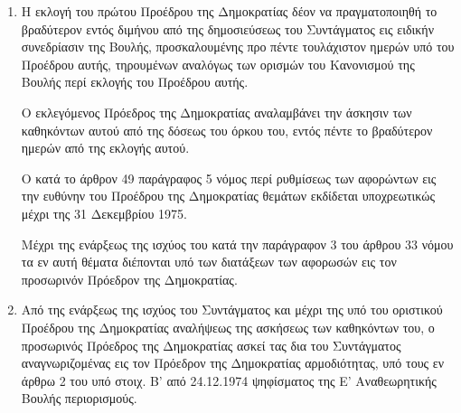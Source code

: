 \documentclass[twoside, a4paper, 10pt]{article}
\begin{document}
\begin{multicols}{2}
\begin{enumerate}
\begin{BigQuote}
\begin{enumerate}
  \item[1.] Η εκλογή του πρώτου Προέδρου της Δημοκρατίας δέον να πραγματοποιηθή το βραδύτερον εντός διμήνου από της δημοσιεύσεως του Συντάγματος εις ειδικήν συνεδρίασιν της Βουλής, προσκαλουμένης προ πέντε τουλάχιστον ημερών υπό του Προέδρου αυτής, τηρουμένων αναλόγως των ορισμών του Κανονισμού της Βουλής περί εκλογής του Προέδρου αυτής.

	Ο εκλεγόμενος Πρόεδρος της Δημοκρατίας αναλαμβάνει την άσκησιν των καθηκόντων αυτού από της δόσεως του όρκου του, εντός πέντε το βραδύτερον ημερών από της εκλογής αυτού.

	Ο κατά το άρθρον 49 παράγραφος 5 νόμος περί ρυθμίσεως των αφορώντων εις την ευθύνην του Προέδρου της Δημοκρατίας θεμάτων εκδίδεται υποχρεωτικώς μέχρι της 31 Δεκεμβρίου 1975.

	Μέχρι της ενάρξεως της ισχύος του κατά την παράγραφον 3 του άρθρου 33 νόμου τα εν αυτή θέματα διέπονται υπό των διατάξεων των αφορωσών εις τον προσωρινόν Πρόεδρον της Δημοκρατίας.
  \item[2.] Από της ενάρξεως της ισχύος του Συντάγματος και μέχρι της υπό του οριστικού Προέδρου της Δημοκρατίας αναλήψεως της ασκήσεως των καθηκόντων του, ο προσωρινός Πρόεδρος της Δημοκρατίας ασκεί τας δια του Συντάγματος αναγνωριζομένας εις τον Πρόεδρον της Δημοκρατίας αρμοδιότητας, υπό τους εν άρθρω 2 του υπό στοιχ. Β' από 24.12.1974 ψηφίσματος της Ε' Αναθεωρητικής Βουλής περιορισμούς.
\end{enumerate}


\end{BigQuote}
\end{enumerate}
\end{multicols}
\end{document}
